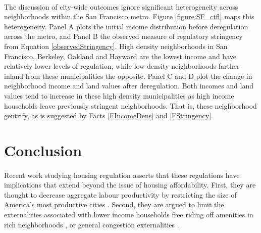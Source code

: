 \documentclass[12pt]{article}
\begin{document}
\paragraph*{}
 The discussion of city-wide outcomes ignore significant heterogeneity across neighborhoods within the San Francisco metro. Figure \ref{figure:SF_ctfl} maps this heterogeneity. Panel A plots the initial income distribution before deregulation across the metro, and Panel B the observed measure of regulatory stringency from Equation \eqref{observedStringency}. High density neighborhoods in San Francisco, Berkeley, Oakland and Hayward are the lowest income and have relatively lower levels of regulation, while low density neighborhoods farther inland from these municipalities the opposite. Panel C and D plot the change in neighborhood income and land values after deregulation. Both incomes and land values tend to increase in these high density municipalities as high income households leave previously stringent neighborhoods. That is, these neighborhood gentrify, as is suggested by Facts \ref{FIncomeDens} and \ref{FStringency}. 
 

\section{Conclusion}
\paragraph*{}
	Recent work studying housing regulation asserts that these regulations have implications that extend beyond the issue of housing affordability. First, they are thought to decrease aggregate labour productivity by restricting the size of America's most productive cities \citep{glaesergyourko2018, hseihmoretti, durantonpugaurbgrowth, parkho}. Second, they are argued to limit the externalities associated with lower income households free riding off amenities in rich neighborhoods \citep{hamilton1976, ineffTiebout, brueckner2021}, or general congestion externalities \citep{parkho, glaesergyourko2018}. 
\end{document}
